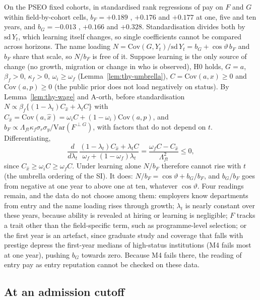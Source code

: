 \begin{thyremark}\label{rem:thy-y1}
On the PSEO fixed cohorts, in standardised rank regressions of pay on $F$ and $G$ within field-by-cohort cells,
$b_F=+0.189$ , $+0.176$ and $+0.177$ at one, five and ten years, and $b_G=-0.013$
, $+0.166$ and $+0.328$. Standardisation divides both by $\mathrm{sd}\,Y_t$, which learning itself
changes, so single coefficients cannot be compared across horizons. The name loading
$N=\mathrm{Cov}(G,Y_t)/\mathrm{sd}\,Y_t=b_G+\cos\vartheta\,b_F$ and $b_F$ share that scale, so $N/b_F$ is free of it.
Suppose learning is the only source of change (no growth, migration or change in who is observed), H0 holds, $G=a$,
$\beta_f>0$, $\kappa_f>0$, $\omega_i\ge\omega_f$ (Lemma~\ref{lem:thy-umbrella}), $C=\mathrm{Cov}(a,x)\ge0$ and
$\mathrm{Cov}(a,p)\ge0$ (the public prior does not load negatively on status). By Lemma~\ref{lem:thy-wage} and
A-orth, before standardisation $N\propto\beta_f\{(1-\lambda_t)C_{\hat x}+\lambda_tC\}$ with
$C_{\hat x}=\mathrm{Cov}(a,\hat x)=\omega_iC+(1-\omega_i)\mathrm{Cov}(a,p)$, and
$b_F\propto\Lambda_{ft}\kappa_f\sigma_r\sigma_y/\mathrm{Var}(F^{\perp G})$, with factors that do not depend on $t$.
Differentiating,
\[
\frac{d}{d\lambda_t}\,\frac{(1-\lambda_t)C_{\hat x}+\lambda_tC}{\omega_f+(1-\omega_f)\lambda_t}
=\frac{\omega_fC-C_{\hat x}}{\Lambda_{ft}^2}\le0,
\]
since $C_{\hat x}\ge\omega_iC\ge\omega_fC$. Under learning alone $N/b_F$ therefore cannot rise with $t$ (the umbrella
ordering of the SI). It does: $N/b_F=\cos\vartheta+b_G/b_F$, and $b_G/b_F$ goes from negative at one year to above
one at ten, whatever $\cos\vartheta$. Four readings remain, and the data do not choose among them: employers know
departments from entry and the name loading rises through growth; $\lambda_t$ is nearly constant over these years,
because ability is revealed at hiring \citep{arcidiacono2010beyond} or learning is negligible; $F$ tracks a trait
other than the field-specific term, such as programme-level selection; or the first year is an artefact, since
graduate study and coverage that falls with prestige depress the first-year medians of high-status institutions (M4
fails most at one year), pushing $b_G$ towards zero. Because M4 fails there, the reading of entry pay as entry
reputation cannot be checked on these data.
\end{thyremark}

\subsection{At an admission cutoff}\label{app:thy:cutoff}

